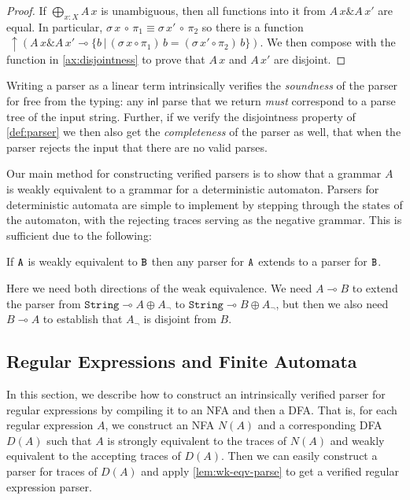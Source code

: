 \documentclass[acmsmall,nonacm]{acmart}
\newcommand{\inl}{\mathsf{inl}}
\newcommand{\lto}{\multimap}
\newcommand{\StringGram}{\texttt{String}}
\newcommand{\ltonl}[1]{~\uparrow #1}
\newcommand{\applto}[2]{#1 \, #2}
\newcommand{\LinSigTy}[3]{\textstyle\bigoplus_{#1 : #2} #3}
\newcommand{\equalizer}[3]{\{#1\,|\,\applto {#2}{#1} = \applto{#3}{#1} \}}
\newcommand{\agdalogo}{%
  \usebox{\logoagdabox}}%
\newcommand{\zenodolink}{https://zenodo.org/records/15049780}
\newcommand{\Agda}{\href{\zenodolink}{\agdalogo}}
\begin{document}
{\begin{proof}
If $\LinSigTy{x}{X}{A\,x}$ is unambiguous, then all functions into it from
$A\,x \& A\,x'$ are equal. In particular,
$\sigma\,x\,\circ\,\pi_{1} \equiv \sigma\,x'\,\circ\,\pi_{2}$ so there is a
function \(
\ltonl{\left(A\,x \& A\,x' \lto
  \equalizer{b}{\left( \sigma\,x \circ \pi_1 \right)}{\left(  \sigma\,x'\circ \pi_2 \right)}
\right)}.
\)
We then compose with the function in \cref{ax:disjointness} to prove that $A\,x$ and $A\,x'$ are disjoint.
\end{proof}

Writing a parser as a linear term intrinsically verifies the \emph{soundness} of
the parser for free from the typing: any $\inl$ parse that we return \emph{must}
correspond to a parse tree of the input string. Further, if we verify the
disjointness property of \cref{def:parser} we then also get the
\emph{completeness} of the parser as well, that when the parser rejects the
input that there are no valid parses.

Our main method for constructing verified parsers is to show that a
grammar $A$ is weakly equivalent to a grammar for a deterministic
automaton. Parsers for deterministic automata are simple to implement
by stepping through the states of the automaton, with the rejecting
traces serving as the negative grammar. This is sufficient due to the
following:
\begin{lemma}[\Agda]
  \label{lem:wk-eqv-parse}
  If $\texttt{A}$ is weakly equivalent to $\texttt{B}$ then any parser for $\texttt{A}$ extends to a
  parser for $\texttt{B}$.
\end{lemma}
Here we need both directions of the weak equivalence. We need $A \lto
B$ to extend the parser from $\StringGram \lto A \oplus A_{\neg}$ to
$\StringGram \lto B \oplus A_{\neg}$, but then we also need $B \lto A$ to
establish that $A_{\neg}$ is disjoint from $B$.

\subsection{Regular Expressions and Finite Automata}

In this section, we describe how to construct an intrinsically
verified parser for regular expressions by compiling it to an NFA and
then a DFA. That is, for each regular expression $A$, we construct an
NFA $N(A)$ and a corresponding DFA $D(A)$ such that $A$ is strongly
equivalent to the traces of $N(A)$ and weakly equivalent to the
accepting traces of $D(A)$. Then we can easily construct a parser for
traces of $D(A)$ and apply \cref{lem:wk-eqv-parse} to get
a verified regular expression parser.

}
\end{document}
